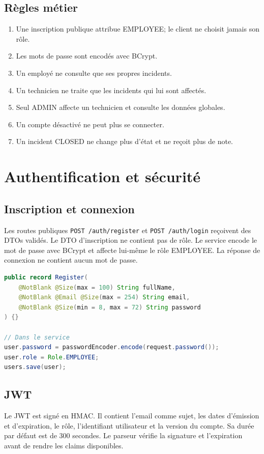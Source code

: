 \documentclass[12pt,a4paper,oneside]{report}
\begin{document}
\section{Règles métier}
\begin{enumerate}
  \item Une inscription publique attribue EMPLOYEE; le client ne choisit jamais son rôle.
  \item Les mots de passe sont encodés avec BCrypt.
  \item Un employé ne consulte que ses propres incidents.
  \item Un technicien ne traite que les incidents qui lui sont affectés.
  \item Seul ADMIN affecte un technicien et consulte les données globales.
  \item Un compte désactivé ne peut plus se connecter.
  \item Un incident CLOSED ne change plus d'état et ne reçoit plus de note.
\end{enumerate}

\chapter{Authentification et sécurité}
\section{Inscription et connexion}
Les routes publiques \texttt{POST /auth/register} et \texttt{POST /auth/login} reçoivent des DTOs validés. Le DTO d'inscription ne contient pas de rôle. Le service encode le mot de passe avec BCrypt et affecte lui-même le rôle EMPLOYEE. La réponse de connexion ne contient aucun mot de passe.

\begin{lstlisting}[language=Java,caption={DTO d'inscription et rôle fixé côté serveur}]
public record Register(
    @NotBlank @Size(max = 100) String fullName,
    @NotBlank @Email @Size(max = 254) String email,
    @NotBlank @Size(min = 8, max = 72) String password
) {}

// Dans le service
user.password = passwordEncoder.encode(request.password());
user.role = Role.EMPLOYEE;
users.save(user);
\end{lstlisting}

\section{JWT}
Le JWT est signé en HMAC. Il contient l'email comme sujet, les dates d'émission et d'expiration, le rôle, l'identifiant utilisateur et la version du compte. Sa durée par défaut est de 300 secondes. Le parseur vérifie la signature et l'expiration avant de rendre les claims disponibles.
\end{document}
